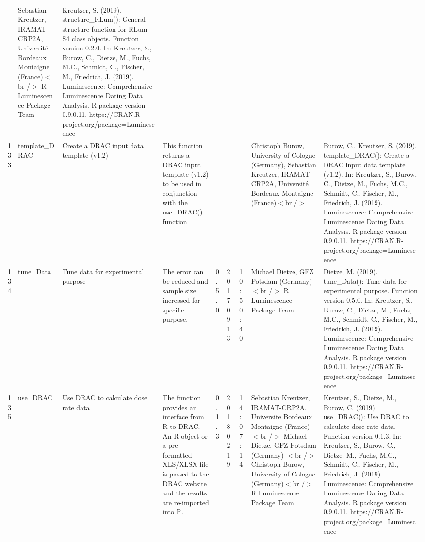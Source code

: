 \begin{table}[ht]
\begin{tabular}{rllllllll}
 & Sebastian Kreutzer, IRAMAT-CRP2A, Université Bordeaux Montaigne (France)$<$br /$>$  R Luminescence Package Team & Kreutzer, S. (2019). structure\_RLum(): General structure function for RLum S4 class objects. Function version 0.2.0. In: Kreutzer, S., Burow, C., Dietze, M., Fuchs, M.C., Schmidt, C., Fischer, M., Friedrich, J. (2019). Luminescence: Comprehensive Luminescence Dating Data Analysis. R package version 0.9.0.11. https://CRAN.R-project.org/package=Luminescence
 \\ 
  133 & template\_DRAC & Create a DRAC input data template (v1.2) & This function returns a DRAC input template (v1.2) to be used in conjunction with the use\_DRAC() function &  &  &  & Christoph Burow, University of Cologne (Germany), Sebastian Kreutzer, IRAMAT-CRP2A, Université Bordeaux Montaigne (France)$<$br /$>$ & Burow, C., Kreutzer, S. (2019). template\_DRAC(): Create a DRAC input data template (v1.2). In: Kreutzer, S., Burow, C., Dietze, M., Fuchs, M.C., Schmidt, C., Fischer, M., Friedrich, J. (2019). Luminescence: Comprehensive Luminescence Dating Data Analysis. R package version 0.9.0.11. https://CRAN.R-project.org/package=Luminescence
 \\ 
  134 & tune\_Data & Tune data for experimental purpose & The error can be reduced and sample size increased for specific purpose. & 0.5.0 & 2017-09-13 & 10:50:40
 & Michael Dietze, GFZ Potsdam (Germany)$<$br /$>$  R Luminescence Package Team & Dietze, M. (2019). tune\_Data(): Tune data for experimental purpose. Function version 0.5.0. In: Kreutzer, S., Burow, C., Dietze, M., Fuchs, M.C., Schmidt, C., Fischer, M., Friedrich, J. (2019). Luminescence: Comprehensive Luminescence Dating Data Analysis. R package version 0.9.0.11. https://CRAN.R-project.org/package=Luminescence
 \\ 
  135 & use\_DRAC & Use DRAC to calculate dose rate data & The function provides an interface from R to DRAC. An R-object or a pre-formatted XLS/XLSX file is passed to the DRAC website and the results are re-imported into R. & 0.1.3 & 2018-02-19 & 14:07:14
 & Sebastian Kreutzer, IRAMAT-CRP2A, Universite Bordeaux Montaigne (France) $<$br /$>$ Michael Dietze, GFZ Potsdam (Germany) $<$br /$>$ Christoph Burow, University of Cologne (Germany)$<$br /$>$  R Luminescence Package Team & Kreutzer, S., Dietze, M., Burow, C. (2019). use\_DRAC(): Use DRAC to calculate dose rate data. Function version 0.1.3. In: Kreutzer, S., Burow, C., Dietze, M., Fuchs, M.C., Schmidt, C., Fischer, M., Friedrich, J. (2019). Luminescence: Comprehensive Luminescence Dating Data Analysis. R package version 0.9.0.11. https://CRAN.R-project.org/package=Luminescence

\end{tabular}
\end{table}
